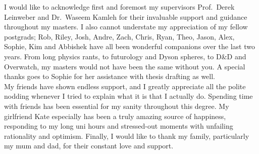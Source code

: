 
\begin{acknowledgements}      


I would like to acknowledge first and foremost my supervisors Prof.\ Derek Leinweber and Dr.\ Waseem Kamleh for their invaluable support and guidance throughout my masters. I also cannot understate my appreciation of my fellow postgrads; Rob, Riley, Josh, Andre, Zach, Chris, Ryan, Theo, Jason, Alex, Sophie, Kim and Abbishek have all been wonderful companions over the last two years. From long physics rants, to futurology and Dyson spheres, to D\&D and Overwatch, my masters would not have been the same without you. A special thanks goes to Sophie for her assistance with thesis drafting as well.\\

My friends have shown endless support, and I greatly appreciate all the polite nodding whenever I tried to explain what it is that I actually do. Spending time with friends has been essential for my sanity throughout this degree. My girlfriend Kate especially has been a truly amazing source of happiness, responding to my long uni hours and stressed-out moments with unfailing rationality and optimism. Finally, I would like to thank my family, particularly my mum and dad, for their constant love and support.  


\end{acknowledgements}

